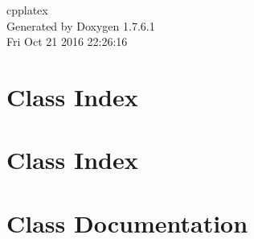 \documentclass[a4paper]{book}
\begin{document}
\hypersetup{pageanchor=false,citecolor=blue}
\begin{titlepage}
\vspace*{7cm}
\begin{center}
{\Large cpplatex }\\
\vspace*{1cm}
{\large \-Generated by Doxygen 1.7.6.1}\\
\vspace*{0.5cm}
{\small Fri Oct 21 2016 22:26:16}\\
\end{center}
\end{titlepage}
\clearemptydoublepage
{}
\tableofcontents
\clearemptydoublepage
{}
\hypersetup{pageanchor=true,citecolor=blue}
\chapter{\-Class \-Index}

\chapter{\-Class \-Index}

\chapter{\-Class \-Documentation}




































\printindex
\end{document}
